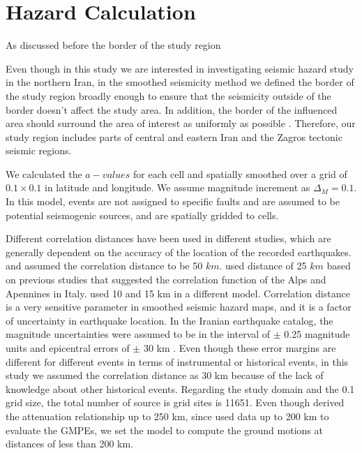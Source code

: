 \section{Hazard Calculation}


As discussed before the border of the study region 

Even though in this study we are interested in investigating seismic hazard study in the northern Iran, in the smoothed seismicity method we defined the border of the study region broadly enough to ensure that the seismicity outside of the border doesn't affect the study area.  In addition, the border of the influenced area should surround the area of interest as uniformly as possible \citep{Lapajne1997}. Therefore, our study region includes parts of central and eastern Iran and the Zagros tectonic seismic regions.

We calculated the $a-values$ for each cell and spatially smoothed over a grid of $0.1 \times 0.1$ in latitude and longitude. We assume magnitude increment as $\Delta_M = 0.1$. In this model, events are not assigned to specific faults and are assumed to be potential seismogenic sources, and are spatially gridded to cells.

Different correlation distances have been used in different studies, which are generally dependent on the accuracy of the location of the recorded earthquakes. \citet{Frankel1995} and \citet{Boyd2008} assumed the correlation distance to be 50 $km$. \citet{Barani2007} used distance of 25 $km$ based on previous studies that suggested the correlation function of the Alps and Apennines in Italy. \citet{Foteva2006} used 10 and 15 km in a different model. Correlation distance is a very sensitive parameter in smoothed seismic hazard maps, and it is a factor of uncertainty in earthquake location. In the Iranian earthquake catalog, the magnitude uncertainties were assumed to be in the interval of $\pm$ 0.25 magnitude units and epicentral errors of $\pm$ 30 km \citep{Zare2012}. Even though these error margins are different for different events in terms of instrumental or historical events, in this study we assumed the correlation distance as 30 km because of the lack of knowledge about other historical events. Regarding the study domain and the 0.1 grid size, the total number of source is grid sites is 11651. Even though \citet{Kalkan2004} derived the attenuation relationship up to 250 km, since \citet{Zafarani2014} used data up to 200 km to evaluate the GMPEs, we set the model to compute the ground motions at distances of less than 200 km.

